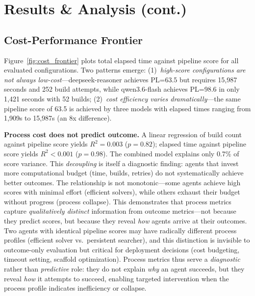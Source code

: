 \section{Results \& Analysis (cont.)}

\subsection{Cost-Performance Frontier}

Figure~\ref{fig:cost_frontier} plots total elapsed time against pipeline score for all evaluated configurations.
Two patterns emerge:
(1)~\emph{high-score configurations are not always low-cost}---deepseek-reasoner achieves PL=63.5 but requires 15,987 seconds and 252 build attempts, while qwen3.6-flash achieves PL=98.6 in only 1,421 seconds with 52 builds;
(2)~\emph{cost efficiency varies dramatically}---the same pipeline score of 63.5 is achieved by three models with elapsed times ranging from 1,909s to 15,987s (an 8x difference).

\textbf{Process cost does not predict outcome.}
A linear regression of build count against pipeline score yields $R^2 = 0.003$ ($p = 0.82$); elapsed time against pipeline score yields $R^2 < 0.001$ ($p = 0.98$).
The combined model explains only 0.7\% of score variance.
This \emph{decoupling} is itself a diagnostic finding: agents that invest more computational budget (time, builds, retries) do not systematically achieve better outcomes.
The relationship is not monotonic---some agents achieve high scores with minimal effort (efficient solvers), while others exhaust their budget without progress (process collapse).
This demonstrates that process metrics capture \emph{qualitatively distinct} information from outcome metrics---not because they predict scores, but because they reveal \emph{how} agents arrive at their outcomes.
Two agents with identical pipeline scores may have radically different process profiles (efficient solver vs.\ persistent searcher), and this distinction is invisible to outcome-only evaluation but critical for deployment decisions (cost budgeting, timeout setting, scaffold optimization).
Process metrics thus serve a \emph{diagnostic} rather than \emph{predictive} role: they do not explain \emph{why} an agent succeeds, but they reveal \emph{how} it attempts to succeed, enabling targeted intervention when the process profile indicates inefficiency or collapse.

